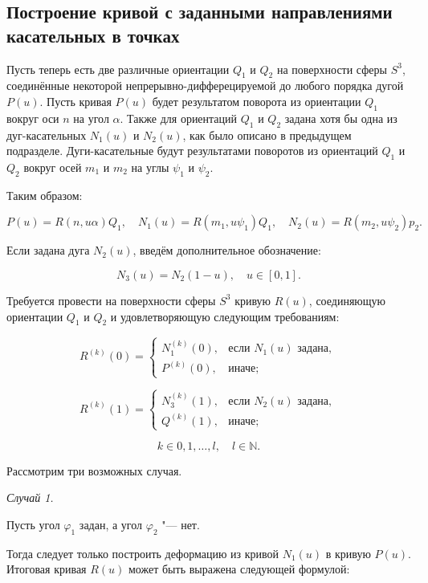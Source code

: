 \subsection*{Построение кривой с заданными направлениями \mbox{касательных} в точках}

Пусть теперь есть две различные ориентации $Q_1$ и $Q_2$ на поверхности сферы $S^3$, соединённые некоторой
непрерывно-дифферецируемой до любого порядка дугой $P(u)$. Пусть кривая $P(u)$ будет результатом поворота из
ориентации $Q_1$ вокруг оси $n$ на угол $\alpha$. Также для ориентаций $Q_1$ и $Q_2$ задана хотя бы одна из
дуг-касательных $N_1(u)$ и $N_2(u)$, как было описано в предыдущем подразделе. Дуги-касательные будут результатами
поворотов из ориентаций $Q_1$ и $Q_2$ вокруг осей $m_1$ и $m_2$ на углы $\psi_1$ и $\psi_2$.

Таким образом:

$$
P(u)=R(n,u\alpha)Q_1, \quad N_1(u)=R(m_1,u\psi_1)Q_1, \quad N_2(u)=R(m_2,u\psi_2)p_2.
$$

Если задана дуга $N_2(u)$, введём дополнительное обозначение:

$$
N_3(u)=N_2(1-u), \quad u \in [0,1].
$$

Требуется провести на поверхности сферы $S^3$ кривую $R(u)$, соединяющую ориентации $Q_1$ и $Q_2$ и удовлетворяющую
следующим требованиям:

\begin{equation*}
R^{(k)}(0)=
  \begin{cases}
    N_1^{(k)}(0), & \text{если $N_1(u)$ задана}, \\
    P^{(k)}(0),   & \text{иначе};
  \end{cases}
\end{equation*}

\begin{equation*}
R^{(k)}(1)=
  \begin{cases}
    N_3^{(k)}(1), & \text{если $N_2(u)$ задана}, \\
    Q^{(k)}(1),   & \text{иначе};
  \end{cases}
\end{equation*}

$$
k \in {0,1,\dots,l}, \quad l \in \mathbb{N}.
$$

Рассмотрим три возможных случая.

\bigskip
\textit{Случай 1.}

Пусть угол $\varphi_1$ задан, а угол $\varphi_2$ "--- нет.

Тогда следует только построить деформацию из кривой $N_1(u)$ в кривую $P(u)$. Итоговая кривая $R(u)$ может быть
выражена следующей формулой:

